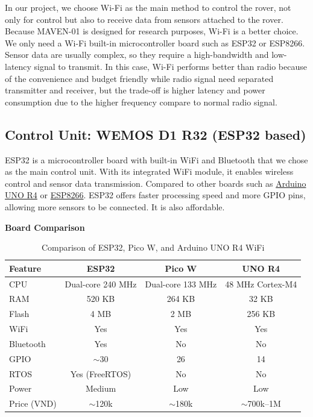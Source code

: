 \vspace{1.5em}
In our project, we choose Wi-Fi as the main method to control the rover, not only for control but also to receive data from sensors attached to the rover. 
Because MAVEN-01 is designed for research purposes, Wi-Fi is a better choice. We only need a Wi-Fi built-in microcontroller board such as ESP32 or ESP8266. 
Sensor data are usually complex, so they require a high-bandwidth and low-latency signal to transmit. In this case, Wi-Fi performs better than radio because of
the convenience and budget friendly while radio signal need separated transmitter and receiver, but the trade-off is higher latency 
and power consumption due to the higher frequency compare to normal radio signal.

\vspace{1.5em}


\subsection{Control Unit: WEMOS D1 R32 (ESP32 based)}
ESP32 is a microcontroller board with built-in WiFi and Bluetooth that we chose as the main control unit.
With its integrated WiFi module, it enables wireless control and sensor data transmission.
Compared to other boards such as \href{https://docs.arduino.cc/resources/datasheets/ABX00087-datasheet.pdf}{Arduino UNO R4} or \href{https://documentation.espressif.com/0a-esp8266ex_datasheet_en.pdf}{ESP8266}.
ESP32 offers faster processing speed and more GPIO pins, allowing more sensors to be connected. It is also affordable.

\vspace{1.5em}\par
\textbf{Board Comparison}

\begin{table}[h]
\centering
\begin{tabular}{|l|c|c|c|}
\hline
\textbf{Feature} & \textbf{ESP32} & \textbf{Pico W} & \textbf{UNO R4} \\
\hline
CPU & Dual-core 240 MHz & Dual-core 133 MHz & 48 MHz Cortex-M4 \\
\hline
RAM & 520 KB & 264 KB & 32 KB \\
\hline
Flash & 4 MB & 2 MB & 256 KB \\
\hline
WiFi & Yes & Yes & Yes \\
\hline
Bluetooth & Yes & No & No \\
\hline
GPIO & $\sim$30 & 26 & 14 \\
\hline
RTOS & Yes (FreeRTOS) & No & No \\
\hline
Power & Medium & Low & Low \\
\hline
Price (VND) & $\sim$120k & $\sim$180k & $\sim$700k--1M \\
\hline
\end{tabular}
\caption{Comparison of ESP32, Pico W, and Arduino UNO R4 WiFi}
\end{table}

